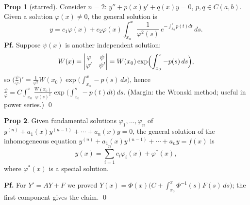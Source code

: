 \documentclass[11pt]{article}
\theoremstyle{definition}
\newtheorem*{proposition}{Prop}
\theoremstyle{remark}
\begin{document}
\begin{proposition}[starred]
Consider $n=2$: $y''+p(x)y'+q(x)y=0$, $p,q\in C(a,b)$. Given a solution $\varphi(x)\neq0$, the
general solution is
\[
y=c_1\varphi(x)+c_2\varphi(x)\int_{x_0}^{x}\frac{1}{\varphi^2(s)}\, e^{-\int_{x_0}^{s}p(t)dt}\, ds.
\]
\textbf{Pf.} Suppose $\psi(x)$ is another independent solution:
\[
W(x)=\begin{vmatrix} \varphi & \psi\\ \varphi' & \psi' \end{vmatrix}=W(x_0)\exp\Bigl(\int_{x_0}^{x}-p(s)\,ds\Bigr),
\]
so
$\bigl(\frac{\psi}{\varphi}\bigr)'=\frac{1}{\varphi^2}W(x_0)\exp\bigl(\int_{x_0}^{x}-p(s)\,ds\bigr)$,
hence
$\frac{\psi}{\varphi}=C\int_{x_0}^{x}\frac{W(x_0)}{\varphi(s)^2}\exp\bigl(\int_{x_0}^{s}-p(t)dt\bigr)\, ds$.
(Margin: the Wronski method; useful in power series.) \qed
\end{proposition}

\begin{proposition}
Given fundamental solutions $\varphi_1,\dots,\varphi_n$ of
$y^{(n)}+a_1(x)y^{(n-1)}+\cdots+a_n(x)y=0$, the general solution of the inhomogeneous equation
$y^{(n)}+a_1(x)y^{(n-1)}+\cdots+a_ny=f(x)$ is
\[
y(x)=\sum_{i=1}^{n}c_i\varphi_i(x)+\varphi^*(x),
\]
where $\varphi^*(x)$ is a special solution.

\textbf{Pf.} For $Y'=AY+F$ we proved $Y(x)=\Phi(x)\bigl(C+\int_{x_0}^{x}\Phi^{-1}(s)F(s)\,ds\bigr)$;
the first component gives the claim. \qed
\end{proposition}
\end{document}
